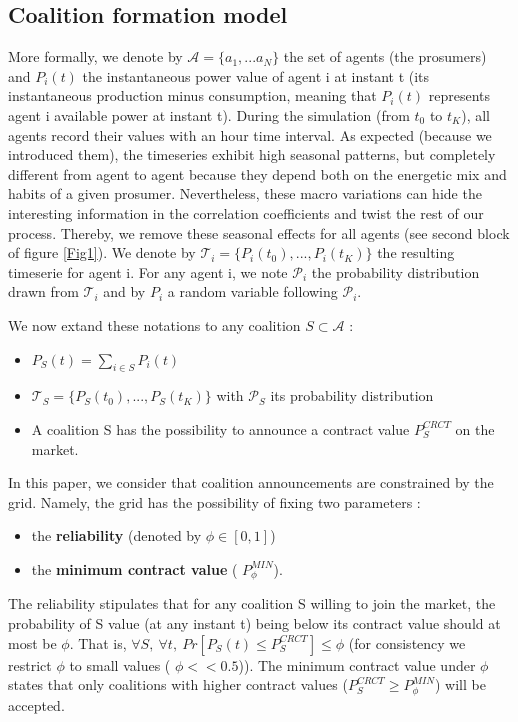 \documentclass[conference]{IEEEtran}
\begin{document}
\subsection{Coalition formation model}\label{subsec:Coalition}
More formally, we denote by $ \mathcal{A} = \{ a_{1},...a_{N} \} $ the set of agents (the prosumers) and $ P_{i}(t) $ the instantaneous power value of agent i at instant t (its instantaneous production minus consumption, meaning that $ P_{i}(t) $ represents agent i available power at instant t). During the simulation (from $t_{0} $ to $ t_{K} $), all agents record their values with an hour time interval. As expected (because we introduced them), the timeseries exhibit high seasonal patterns, but completely different from agent to agent because they depend both on the energetic mix and habits of a given prosumer. Nevertheless, these macro variations can hide the interesting information in the correlation coefficients and twist the rest of our process. Thereby, we remove these seasonal effects for all agents (see second block of figure \ref{Fig1}). We denote by $ \mathcal{T}_{i} = \{ P_{i}(t_{0}),...,P_{i}(t_{K}) \} $ the resulting timeserie for  agent i. For any agent i, we note $ \mathcal{P}_{i} $ the probability distribution drawn from $ \mathcal{T}_{i} $ and by $ P_{i} $ a random variable following $ \mathcal{P}_{i} $.

We now extand these notations to any coalition $ S \subset \mathcal{A} $ : 
\begin{itemize}
\item $ P_{S}(t) = \sum_{i \in S} P_{i}(t) $
\item $ \mathcal{T}_{S} = \{ P_{S}(t_{0}),...,P_{S}(t_{K}) \} $ with $ \mathcal{P}_{S} $ its probability distribution
\item A coalition S has the possibility to announce a contract value $ P_{S}^{CRCT} $ on the market.
\end{itemize}

In this paper, we consider that coalition announcements are constrained by the grid. Namely, the grid has the possibility of fixing two parameters : 

\begin{itemize}
\item the \textbf{reliability} (denoted by $ \phi \in [0,1] $)
\item the \textbf{minimum contract value} ( $ P_{\phi}^{MIN} $). 
\end{itemize}

The reliability stipulates that for any coalition S willing to join the market, the probability of S value (at any instant t) being below its contract value should at most be $ \phi $. That is, $ \forall S,\ \forall t,\ Pr[P_{S}(t) \leq P_{S}^{CRCT} ] \leq \phi $ (for consistency we restrict $ \phi $ to small values ( $ \phi << 0.5 $)). The minimum contract value under $ \phi $ states that only coalitions with higher contract values ($ P_{S}^{CRCT} \geq P_{\phi}^{MIN} $) will be accepted.
\end{document}
